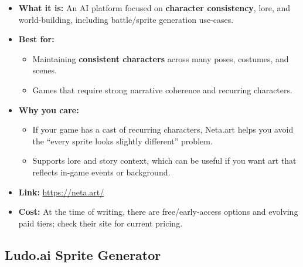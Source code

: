 \documentclass[11pt]{article}
\begin{document}
\begin{itemize}
    \item \textbf{What it is:} An AI platform focused on \textbf{character consistency}, lore, and world-building, including battle/sprite generation use-cases.
    \item \textbf{Best for:}
    \begin{itemize}
        \item Maintaining \textbf{consistent characters} across many poses, costumes, and scenes.
        \item Games that require strong narrative coherence and recurring characters.
    \end{itemize}
    \item \textbf{Why you care:}
    \begin{itemize}
        \item If your game has a cast of recurring characters, Neta.art helps you avoid the ``every sprite looks slightly different'' problem.
        \item Supports lore and story context, which can be useful if you want art that reflects in-game events or background.
    \end{itemize}
    \item \textbf{Link:} \url{https://neta.art/}
    \item \textbf{Cost:} At the time of writing, there are free/early-access options and evolving paid tiers; check their site for current pricing.
\end{itemize}

\subsection{Ludo.ai Sprite Generator}
\end{document}
